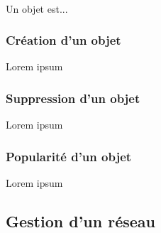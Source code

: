 \documentclass[12pt]{article}
\begin{document}
\paragraph{} Un objet est...

\subsubsection{Création d'un objet}
Lorem ipsum

\subsubsection{Suppression d'un objet}
Lorem ipsum

\subsubsection{Popularité d'un objet}
Lorem ipsum





\subsection{Gestion d'un réseau}
\end{document}

